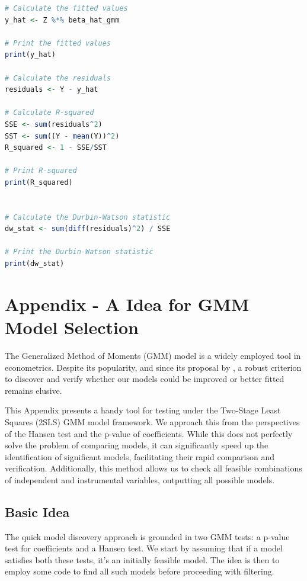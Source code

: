 \documentclass[12pt]{article}
\begin{document}
\begin{lstlisting}[language=R]
# Calculate the fitted values
y_hat <- Z %*% beta_hat_gmm

# Print the fitted values
print(y_hat)

# Calculate the residuals
residuals <- Y - y_hat

# Calculate R-squared
SSE <- sum(residuals^2)
SST <- sum((Y - mean(Y))^2)
R_squared <- 1 - SSE/SST

# Print R-squared
print(R_squared)


# Calculate the Durbin-Watson statistic
dw_stat <- sum(diff(residuals)^2) / SSE

# Print the Durbin-Watson statistic
print(dw_stat)

\end{lstlisting}





\newpage
{}
\section{Appendix - A Idea for GMM Model Selection}
\hypertarget{thesentence}{The Generalized Method of Moments (GMM) model is a widely employed tool in econometrics. Despite its popularity, and since its proposal by \cite{hansen1982large}, a robust criterion to discover and verify whether our models could be improved or better fitted remains elusive.} 

This Appendix presents a handy tool for testing under the Two-Stage Least Squares (2SLS) GMM model framework. We approach this from the perspectives of the Hansen test and the p-value of coefficients. While this does not perfectly solve the problem of comparing models, it can significantly speed up the identification of significant models, facilitating their rapid comparison and verification. Additionally, this method allows us to check all feasible combinations of independent and instrumental variables, outputting all possible models.

\subsection{Basic Idea}

The quick model discovery approach is grounded in two GMM tests: a p-value test for coefficients and a Hansen test. We start by assuming that if a model satisfies both these tests, it's an initially feasible model. The idea is then to employ some code to find all such models before proceeding with filtering.
\end{document}
